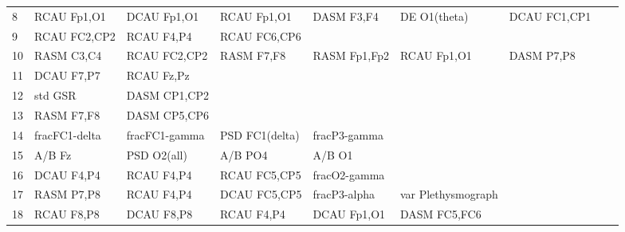 \begin{landscape}
\begin{table}[]
\begin{tabular}{l|llllllll}
8                  & RCAU Fp1,O1          & DCAU Fp1,O1             & RCAU Fp1,O1          & DASM F3,F4         & DE O1(theta)          & DCAU FC1,CP1         &                 &                 \\
9                  & RCAU FC2,CP2         & RCAU F4,P4              & RCAU FC6,CP6         &                    &                       &                      &                 &                 \\
10                 & RASM C3,C4           & RCAU FC2,CP2            & RASM F7,F8           & RASM Fp1,Fp2       & RCAU Fp1,O1           & DASM P7,P8           &                 &                 \\
11                 & DCAU F7,P7           & RCAU Fz,Pz              &                      &                    &                       &                      &                 &                 \\
12                 & std GSR              & DASM CP1,CP2            &                      &                    &                       &                      &                 &                 \\
13                 & RASM F7,F8           & DASM CP5,CP6            &                      &                    &                       &                      &                 &                 \\
14                 & fracFC1-delta        & fracFC1-gamma           & PSD FC1(delta)       & fracP3-gamma       &                       &                      &                 &                 \\
15                 & A/B Fz               & PSD O2(all)             & A/B PO4              & A/B O1             &                       &                      &                 &                 \\
16                 & DCAU F4,P4           & RCAU F4,P4              & RCAU FC5,CP5         & fracO2-gamma       &                       &                      &                 &                 \\
17                 & RASM P7,P8           & RCAU F4,P4              & DCAU FC5,CP5         & fracP3-alpha       & var Plethysmograph    &                      &                 &                 \\
18                 & RCAU F8,P8           & DCAU F8,P8              & RCAU F4,P4           & DCAU Fp1,O1        & DASM FC5,FC6          &                      &                 &                 \\

\end{tabular}
\end{table}
\end{landscape}
